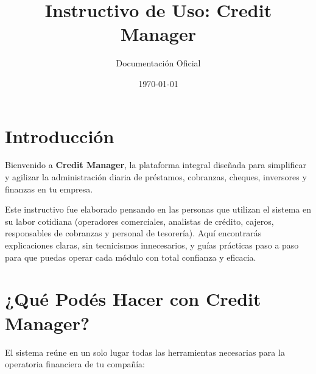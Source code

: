 \documentclass[12pt,a4paper]{article}
\title{Instructivo de Uso: Credit Manager}
\author{Documentación Oficial}
\date{\today}
\renewcommand{\_}{\textunderscore\allowbreak}
\begin{document}
\maketitle
\newpage

\tableofcontents
\newpage

\section{Introducción}
Bienvenido a \textbf{Credit Manager}, la plataforma integral diseñada para simplificar y agilizar la administración diaria de préstamos, cobranzas, cheques, inversores y finanzas en tu empresa. 

Este instructivo fue elaborado pensando en las personas que utilizan el sistema en su labor cotidiana (operadores comerciales, analistas de crédito, cajeros, responsables de cobranzas y personal de tesorería). Aquí encontrarás explicaciones claras, sin tecnicismos innecesarios, y guías prácticas paso a paso para que puedas operar cada módulo con total confianza y eficacia.

\newpage

\section{¿Qué Podés Hacer con Credit Manager?}
El sistema reúne en un solo lugar todas las herramientas necesarias para la operatoria financiera de tu compañía:
\end{document}
